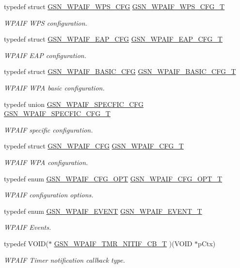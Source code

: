 \begin{DoxyCompactItemize}
typedef struct \hyperlink{a00427}{GSN\_\-WPAIF\_\-WPS\_\-CFG} \hyperlink{a00687_gad51d45617a4ed8eff4b53f1196737959}{GSN\_\-WPAIF\_\-WPS\_\-CFG\_\-T}
\begin{DoxyCompactList}\small\item\em WPAIF WPS configuration. \end{DoxyCompactList}\item 
typedef struct \hyperlink{a00423}{GSN\_\-WPAIF\_\-EAP\_\-CFG} \hyperlink{a00687_gaca9adbc88af0681a3cfbc31eb772a548}{GSN\_\-WPAIF\_\-EAP\_\-CFG\_\-T}
\begin{DoxyCompactList}\small\item\em WPAIF EAP configuration. \end{DoxyCompactList}\item 
typedef struct \hyperlink{a00420}{GSN\_\-WPAIF\_\-BASIC\_\-CFG} \hyperlink{a00687_gae101e1cf8fc4d75a8d0f652d2a4fa298}{GSN\_\-WPAIF\_\-BASIC\_\-CFG\_\-T}
\begin{DoxyCompactList}\small\item\em WPAIF WPA basic configuration. \end{DoxyCompactList}\item 
typedef union \hyperlink{a00426}{GSN\_\-WPAIF\_\-SPECFIC\_\-CFG} \hyperlink{a00687_ga976816e9ade6b55dce10949691396249}{GSN\_\-WPAIF\_\-SPECFIC\_\-CFG\_\-T}
\begin{DoxyCompactList}\small\item\em WPAIF specific configuration. \end{DoxyCompactList}\item 
typedef struct \hyperlink{a00422}{GSN\_\-WPAIF\_\-CFG} \hyperlink{a00687_ga7cc823d929ee57574f3590cd8af66f18}{GSN\_\-WPAIF\_\-CFG\_\-T}
\begin{DoxyCompactList}\small\item\em WPAIF WPA configuration. \end{DoxyCompactList}\item 
typedef enum \hyperlink{a00687_ga0f2a6686511220638235644511dee215}{GSN\_\-WPAIF\_\-CFG\_\-OPT} \hyperlink{a00687_ga40c2baeb843f878b19724138a045f065}{GSN\_\-WPAIF\_\-CFG\_\-OPT\_\-T}
\begin{DoxyCompactList}\small\item\em WPAIF configuration options. \end{DoxyCompactList}\item 
typedef enum \hyperlink{a00687_gab34b81549296cd8fc0728be0cfa16e87}{GSN\_\-WPAIF\_\-EVENT} \hyperlink{a00687_ga73929543fff4d9b512803f4cb0e94b47}{GSN\_\-WPAIF\_\-EVENT\_\-T}
\begin{DoxyCompactList}\small\item\em WPAIF Events. \end{DoxyCompactList}\item 
typedef VOID($\ast$ \hyperlink{a00687_ga84bfdf616b263689a81c060d1bdf224b}{GSN\_\-WPAIF\_\-TMR\_\-NITIF\_\-CB\_\-T} )(VOID $\ast$pCtx)
\begin{DoxyCompactList}\small\item\em WPAIF Timer notification callback type. \end{DoxyCompactList}\end{DoxyCompactItemize}
